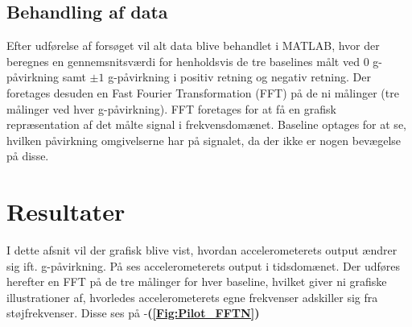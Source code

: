 \subsection{Behandling af data}
Efter udførelse af forsøget vil alt data blive behandlet i MATLAB, hvor der beregnes en gennemsnitsværdi for henholdsvis de tre baselines målt ved $0$ g-påvirkning samt $\pm1$ g-påvirkning i positiv retning og negativ retning. Der foretages desuden en Fast Fourier Transformation (FFT) på de ni målinger (tre målinger ved hver g-påvirkning). FFT foretages for at få en grafisk repræsentation af det målte signal i frekvensdomænet. Baseline optages for at se, hvilken påvirkning omgivelserne har på signalet, da der ikke er nogen bevægelse på disse.

\section{Resultater}\label{Sec_Pilot_Data}
I dette afsnit vil der grafisk blive vist, hvordan accelerometerets output ændrer sig ift. g-påvirkning. På  ses accelerometerets output i tidsdomænet. Der udføres herefter en FFT på de tre målinger for hver baseline, hvilket giver ni grafiske illustrationer af, hvorledes accelerometerets egne frekvenser adskiller sig fra støjfrekvenser. Disse ses på -\textbf{(\ref{Fig:Pilot_FFTN})}

